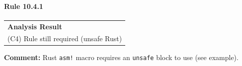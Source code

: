 \paragraph{Rule 10.4.1}
\begin{longtable}{p{13cm}}
\textbf{Analysis Result} \\
(C4) Rule still required (unsafe Rust) \\
\end{longtable}
\textbf{Comment:} Rust \texttt{asm!} macro requires an \texttt{unsafe} block to use (see example). \\


